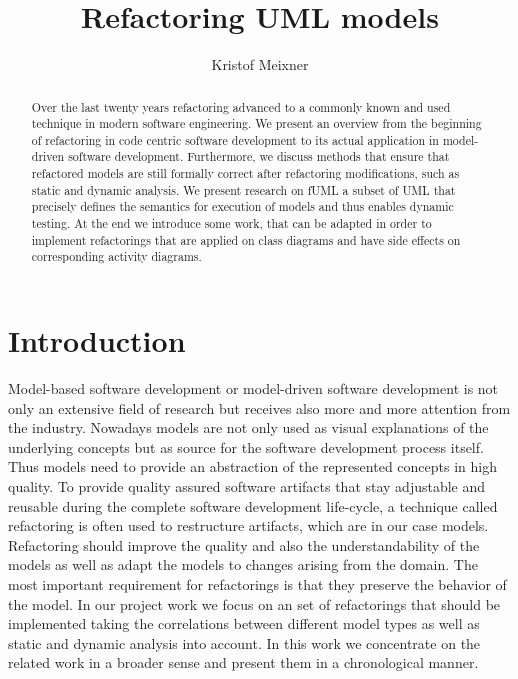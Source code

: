 \documentclass{llncs}
\begin{document}
\pagestyle{plain}

\title{Refactoring UML models}
\author{Kristof Meixner}

\maketitle

\begin{abstract} Over the last twenty years refactoring advanced to a commonly known and used technique in modern
software engineering. We present an overview from the beginning of refactoring in code centric software development to its actual application
in model-driven software development. Furthermore, we discuss methods that ensure that refactored models are still formally 
correct after refactoring modifications, such as static and dynamic analysis. We present research on fUML a subset of UML that precisely defines the semantics 
for execution of models and thus enables dynamic testing. At the end we introduce some work, that can be adapted in order to
implement refactorings that are applied on class diagrams and have side effects on corresponding activity diagrams.
\end{abstract}


\tableofcontents
\newpage


\section{Introduction}
\label{sec:intro}

Model-based software development or model-driven software development is not only an extensive field of research but
receives also more and more attention from the industry. Nowadays models are not only used as visual explanations of
the underlying concepts but as source for the software development process itself. Thus models need to provide an abstraction of the
represented concepts in high quality. To provide quality assured software artifacts that stay adjustable and reusable during the complete software development
life-cycle, a technique called refactoring is often used to restructure artifacts, which are in our case models. Refactoring should improve
the quality and also the understandability of the models as well as adapt the models to changes arising from the
domain. The most important requirement for refactorings is that they preserve the behavior of the model. In our project
work we focus on an set of refactorings that should be implemented taking the correlations between different model types
as well as static and dynamic analysis into account. In this work we concentrate on the related work in a broader sense
and present them in a chronological manner.
\end{document}
